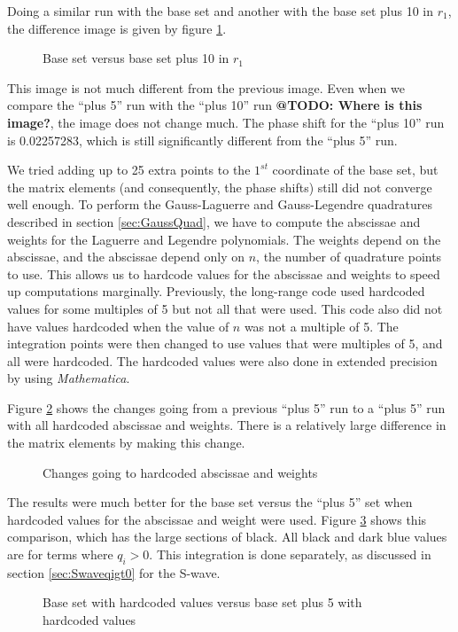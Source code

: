 \documentclass[Dissertation.tex]{subfiles}
\begin{document}
Doing a similar run with the base set and another with the base set plus 10 in $r_1$, the difference image is given by figure \ref{fig:BasevsBaseplus10}.
\begin{figure}[H]
	\centering
	\caption{Base set versus base set plus 10 in $r_1$}
	\label{fig:BasevsBaseplus10}
\end{figure}
\noindent This image is not much different from the previous image. Even when we compare the ``plus 5'' run with the ``plus 10'' run \textbf{@TODO: Where is this image?}, the image does not change much. The phase shift for the ``plus 10'' run is 0.02257283, which is still significantly different from the ``plus 5'' run.

We tried adding up to 25 extra points to the $1^{st}$ coordinate of the base set, but the matrix elements (and consequently, the phase shifts) still did not converge well enough. To perform the Gauss-Laguerre and Gauss-Legendre quadratures described in section \ref{sec:GaussQuad}, we have to compute the abscissae and weights for the Laguerre and Legendre polynomials. The weights depend on the abscissae, and the abscissae depend only on $n$, the number of quadrature points to use. This allows us to hardcode values for the abscissae and weights to speed up computations marginally. Previously, the long-range code used hardcoded values for some multiples of 5 but not all that were used. This code also did not have values hardcoded when the value of $n$ was not a multiple of 5. The integration points were then changed to use values that were multiples of 5, and all were hardcoded. The hardcoded values were also done in extended precision by using \emph{Mathematica}.

Figure \ref{fig:Base5vsBase5hardcoderound} shows the changes going from a previous ``plus 5'' run to a ``plus 5'' run with all hardcoded abscissae and weights. There is a relatively large difference in the matrix elements by making this change.
\begin{figure}[H]
	\centering
	\caption{Changes going to hardcoded abscissae and weights}
	\label{fig:Base5vsBase5hardcoderound}
\end{figure}

The results were much better for the base set versus the ``plus 5'' set when hardcoded values for the abscissae and weight were used. Figure \ref{fig:BasehardcodevsBase5hardcode} shows this comparison, which has the large sections of black. All black and dark blue values are for terms where $q_i > 0$. This integration is done separately, as discussed in section \ref{sec:Swaveqigt0} for the S-wave.
\begin{figure}[H]
	\centering
	\caption{Base set with hardcoded values versus base set plus 5 with hardcoded values}
	\label{fig:BasehardcodevsBase5hardcode}
\end{figure}
\end{document}
